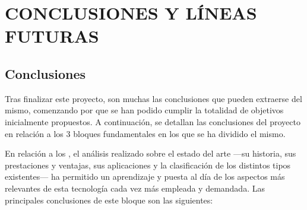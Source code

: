\newpage
\section{CONCLUSIONES Y LÍNEAS FUTURAS} \label{conclusiones}

\subsection{Conclusiones}

Tras finalizar este proyecto, son muchas las conclusiones que pueden extraerse del mismo, comenzando por que se han podido cumplir la totalidad de objetivos inicialmente propuestos. A continuación, se detallan las conclusiones del proyecto en relación a los 3 bloques fundamentales en los que se ha dividido el mismo.

En relación a los \underline{\textbf{}}, el análisis realizado sobre el estado del arte ---su historia, sus prestaciones y ventajas, sus aplicaciones y la clasificación de los distintos tipos existentes--- ha permitido un aprendizaje y puesta al día de los aspectos más relevantes de esta tecnología cada vez más empleada y demandada. Las principales conclusiones de este bloque son las siguientes:

